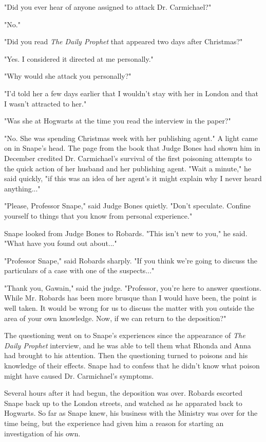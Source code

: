 "Did you ever hear of anyone assigned to attack Dr. Carmichael?"

"No."

"Did you read \emph{The Daily Prophet} that appeared two days after Christmas?"

"Yes. I considered it directed at me personally."

"Why would she attack you personally?"

"I'd told her a few days earlier that I wouldn't stay with her in London and that I wasn't attracted to her."

"Was she at Hogwarts at the time you read the interview in the paper?"

"No. She was spending Christmas week with her publishing agent." A light came on in Snape's head. The page from the book that Judge Bones had shown him in December credited Dr. Carmichael's survival of the first poisoning attempts to the quick action of her husband and her publishing agent. "Wait a minute," he said quickly, "if this was an idea of her agent's it might explain why I never heard anything..."

"Please, Professor Snape," said Judge Bones quietly. "Don't speculate. Confine yourself to things that you know from personal experience."

Snape looked from Judge Bones to Robards. "This isn't new to you," he said. "What have you found out about..."

"Professor Snape," said Robards sharply. "If you think we're going to discuss the particulars of a case with one of the suspects..."

"Thank you, Gawain," said the judge. "Professor, you're here to answer questions. While Mr. Robards has been more brusque than I would have been, the point is well taken. It would be wrong for us to discuss the matter with you outside the area of your own knowledge. Now, if we can return to the deposition?"

The questioning went on to Snape's experiences since the appearance of \emph{The Daily Prophet} interview, and he was able to tell them what Rhonda and Anna had brought to his attention. Then the questioning turned to poisons and his knowledge of their effects. Snape had to confess that he didn't know what poison might have caused Dr. Carmichael's symptoms.

Several hours after it had begun, the deposition was over. Robards escorted Snape back up to the London streets, and watched as he apparated back to Hogwarts. So far as Snape knew, his business with the Ministry was over for the time being, but the experience had given him a reason for starting an investigation of his own.

